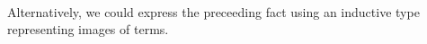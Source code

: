 \begin{code}
\AgdaSymbol{\{}\AgdaSymbol{\}}\AgdaSpace{}%
\AgdaSpace{}%
\AgdaSymbol{(}\AgdaSpace{}%
\AgdaSpace{}%
\AgdaSymbol{)}\AgdaSpace{}%
\AgdaSpace{}%
\AgdaSpace{}%
\AgdaSymbol{=}\<%
\\
\>[1][@{}l@{\AgdaIndent{0}}]%
\>[2]\AgdaSpace{}%
\AgdaSpace{}%
\AgdaSpace{}%
\AgdaSpace{}%
\AgdaSpace{}%
\AgdaSymbol{(}\AgdaSpace{}%
\AgdaSpace{}%
\AgdaSpace{}%
\AgdaSymbol{)}\AgdaSpace{}%
\AgdaSymbol{)}\AgdaSpace{}%
\AgdaSpace{}%
\AgdaSpace{}%
\AgdaSpace{}%
\AgdaSpace{}%
\AgdaSpace{}%
\AgdaSymbol{\{}\AgdaSymbol{\}}\AgdaSpace{}%
\AgdaSpace{}%
\AgdaSymbol{(}\AgdaSpace{}%
\AgdaSymbol{)}\AgdaSpace{}%
\AgdaSpace{}%
\<%
\end{code}
\ccpad
Alternatively, we could express the preceeding fact using an inductive
type representing images of terms.
\ccpad
